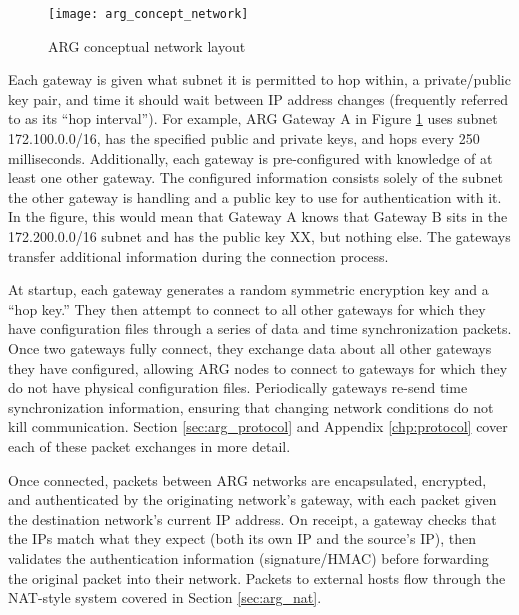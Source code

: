 \begin{figure}
	\centering
	\texttt{[image: arg\_concept\_network]}
	\caption{\ac{ARG} conceptual network layout}
	\label{fig:arg_concept_network}
\end{figure}

\par Each gateway is given what subnet it is permitted to hop within, a private/public key pair, and time it should wait between \ac{IP} address changes (frequently referred to as its ``hop interval''). For example, \ac{ARG} Gateway A in Figure \ref{fig:arg_concept_network} uses subnet 172.100.0.0/16, has the specified public and private keys, and hops every 250 milliseconds. Additionally, each gateway is pre-configured with knowledge of at least one other gateway. The configured information consists solely of the subnet the other gateway is handling and a public key to use for authentication with it. In the figure, this would mean that Gateway A knows that Gateway B sits in the 172.200.0.0/16 subnet and has the public key XX, but nothing else. The gateways transfer additional information during the connection process. 

\par At startup, each gateway generates a random symmetric encryption key and a ``hop key.'' They then attempt to connect to all other gateways for which they have configuration files through a series of data and time synchronization packets. Once two gateways fully connect, they exchange data about all other gateways they have configured, allowing \ac{ARG} nodes to connect to gateways for which they do not have physical configuration files. Periodically gateways re-send time synchronization information, ensuring that changing network conditions do not kill communication. Section \ref{sec:arg_protocol} and Appendix \ref{chp:protocol} cover each of these packet exchanges in more detail.

\par Once connected, packets between ARG networks are encapsulated, encrypted, and authenticated by the originating network's gateway, with each packet given the destination network's current \ac{IP} address. On receipt, a gateway checks that the \acp{IP} match what they expect (both its own IP and the source's IP), then validates the authentication information (signature/\ac{HMAC}) before forwarding the original packet into their network. Packets to external hosts flow through the \ac{NAT}-style system covered in Section \ref{sec:arg_nat}. 

